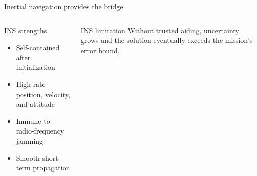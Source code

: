 \documentclass[aspectratio=169,11pt]{beamer}
\begin{document}
\begin{frame}{Inertial navigation provides the bridge}
  \begin{columns}[T,onlytextwidth]
      \begin{block}{INS strengths}
        \begin{itemize}
          \item Self-contained after initialization
          \item High-rate position, velocity, and attitude
          \item Immune to radio-frequency jamming
          \item Smooth short-term propagation
        \end{itemize}
      \end{block}
      \pause
      \begin{alertblock}{INS limitation}
        Without trusted aiding, uncertainty grows and the solution eventually
        exceeds the mission's error bound.
      \end{alertblock}
  \end{columns}
\end{frame}
\end{document}
